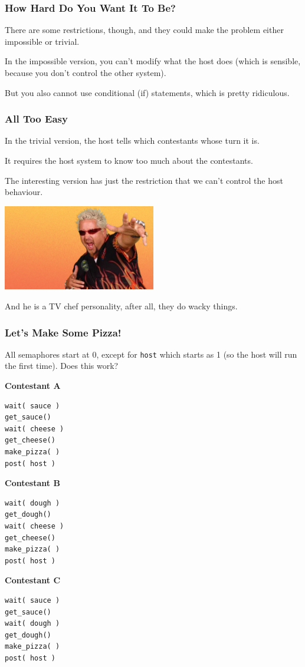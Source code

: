 \begin{frame}
\frametitle{How Hard Do You Want It To Be?}

There are some restrictions, though, and they could make the problem either impossible or trivial.

In the impossible version, you can't modify what the host does (which is sensible, because you don't control the other system).

But you also cannot use conditional (if) statements, which is pretty ridiculous. 

\end{frame}

\begin{frame}
\frametitle{All Too Easy}

 In the trivial version, the host tells which contestants whose turn it is.
 
 It requires the host system to know too much about the contestants.

The interesting version has just the restriction that we can't control the host behaviour. 



\begin{center}
	\includegraphics[width=0.5\textwidth]{images/fieri.jpg}
\end{center}

And he is a TV chef personality, after all, they do wacky things.


\end{frame}


\begin{frame}[fragile]
\frametitle{Let's Make Some Pizza!}
 All semaphores start at 0, except for \texttt{host} which starts as 1 (so the host will run the first time). Does this work?

\begin{multicols}{3}
\textbf{Contestant A}
\begin{lstlisting}
wait( sauce )
get_sauce()
wait( cheese )
get_cheese()
make_pizza( )
post( host )
\end{lstlisting}
\columnbreak
\textbf{Contestant B}
\begin{lstlisting}
wait( dough )
get_dough()
wait( cheese )
get_cheese()
make_pizza( )
post( host )
\end{lstlisting}
\columnbreak
\textbf{Contestant C}
\begin{lstlisting}
wait( sauce )
get_sauce()
wait( dough )
get_dough()
make_pizza( )
post( host )
\end{lstlisting}
\end{multicols}

\end{frame}


